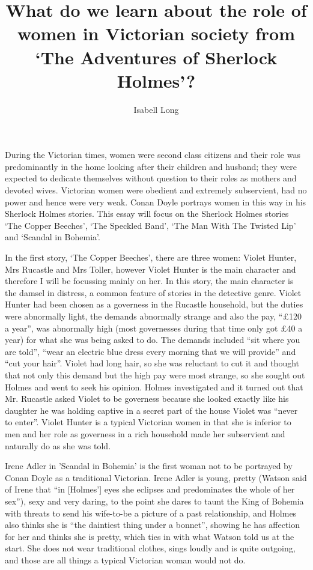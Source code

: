 \documentclass[a4paper]{article}
\begin{document}
\title{What do we learn about the role of women in Victorian society from `The Adventures of Sherlock Holmes'?}
\author{Isabell Long}
\maketitle

During the Victorian times, women were second class citizens and their role was predominantly in the home looking after their children and husband; they were expected to dedicate themselves without question to their roles as mothers and devoted wives.  Victorian women were obedient and extremely subservient, had no power and hence were very weak.  Conan Doyle portrays women in this way in his Sherlock Holmes stories.  This essay will focus on the Sherlock Holmes stories `The Copper Beeches', `The Speckled Band', `The Man With The Twisted Lip' and `Scandal in Bohemia'.

In the first story, `The Copper Beeches', there are three women: Violet Hunter, Mrs Rucastle and Mrs Toller, however Violet Hunter is the main character and therefore I will be focussing mainly on her.  In this story, the main character is the damsel in distress, a common feature of stories in the detective genre.  Violet Hunter had been chosen as a governess in the Rucastle household, but the duties were abnormally light, the demands abnormally strange and also the pay, ``£120 a year'', was abnormally high (most governesses during that time only got £40 a year) for what she was being asked to do.  The demands included ``sit where you are told'', ``wear an electric blue dress every morning that we will provide'' and “cut your hair''.  Violet had long hair, so she was reluctant to cut it and thought that not only this demand but the high pay were most strange, so she sought out Holmes and went to seek his opinion.  Holmes investigated and it turned out that Mr. Rucastle asked Violet to be governess because she looked exactly like his daughter he was holding captive in a secret part of the house Violet was ``never to enter''.  Violet Hunter is a typical Victorian women in that she is inferior to men and her role as governess in a rich household made her subservient and naturally do as she was told.

Irene Adler in 'Scandal in Bohemia' is the first woman not to be portrayed by Conan Doyle as a traditional Victorian.  Irene Adler is young, pretty (Watson said of Irene that ``in [Holmes'] eyes she eclipses and predominates the whole of her sex''), sexy and very daring, to the point she dares to taunt the King of Bohemia with threats to send his wife-to-be a picture of a past relationship, and Holmes also thinks she is ``the daintiest thing under a bonnet'', showing he has affection for her and thinks she is pretty, which ties in with what Watson told us at the start.  She does not wear traditional clothes, sings loudly and is quite outgoing, and those are all things a typical Victorian woman would not do.
\end{document}
